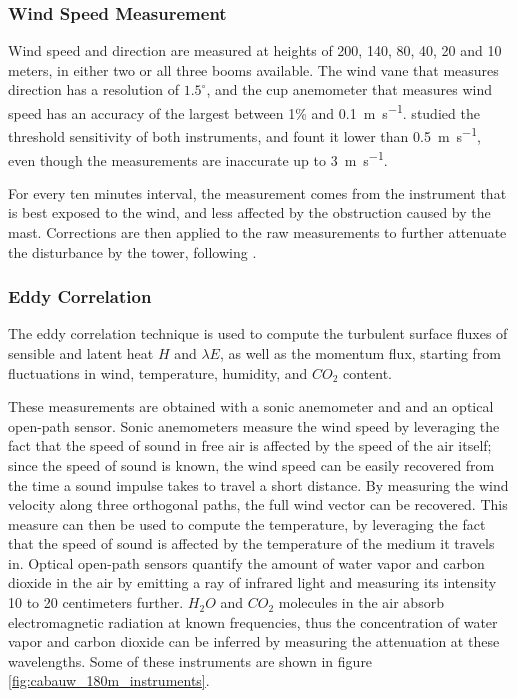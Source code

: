 \documentclass[a4paper]{book}
\begin{document}
\subsubsection{Wind Speed Measurement}
Wind speed and direction are measured at heights of 200, 140, 80, 40, 20 and 10 meters, in either two or all three booms available. The wind vane that measures direction has a resolution of $1.5^\circ$, and the cup anemometer that measures wind speed has an accuracy of the largest between 1\% and \SI{0.1}{\meter\per\second}. \cite{windinstr} studied the threshold sensitivity of both instruments, and fount it lower than \SI{0.5}{\meter\per\second}, even though the measurements are inaccurate up to \SI{3}{\meter\per\second}.

For every ten minutes interval, the measurement comes from the instrument that is best exposed to the wind, and less affected by the obstruction caused by the mast. Corrections are then applied to the raw measurements to further attenuate the disturbance by the tower, following \cite{winddistortion}.

\subsubsection{Eddy Correlation}
\label{sec:eddy_correlation}
The eddy correlation technique is used to compute the turbulent surface fluxes of sensible and latent heat $H$ and $\lambda E$, as well as the momentum flux, starting from fluctuations in wind, temperature, humidity, and $CO_2$ content.

These measurements are obtained with a sonic anemometer and and an optical open-path sensor. Sonic anemometers measure the wind speed by leveraging the fact that the speed of sound in free air is affected by the speed of the air itself; since the speed of sound is known, the wind speed can be easily recovered from the time a sound impulse takes to travel a short distance. By measuring the wind velocity along three orthogonal paths, the full wind vector can be recovered. This measure can then be used to compute the temperature, by leveraging the fact that the speed of sound is affected by the temperature of the medium it travels in. Optical open-path sensors quantify the amount of water vapor and carbon dioxide in the air by emitting a ray of infrared light and measuring its intensity 10 to 20 centimeters further. $H_2O$ and $CO_2$ molecules in the air absorb electromagnetic radiation at known frequencies, thus the concentration of water vapor and carbon dioxide can be inferred by measuring the attenuation at these wavelengths. Some of these instruments are shown in figure \ref{fig:cabauw_180m_instruments}.
\end{document}
